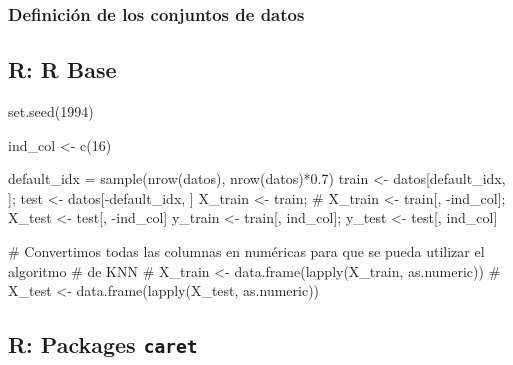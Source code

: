 \documentclass[
  letterpaper,
  DIV=11,
  numbers=noendperiod]{scrartcl}
\newenvironment{Shaded}{\begin{snugshade}}{\end{snugshade}}
\newcommand{\CommentTok}[1]{\textcolor[rgb]{0.37,0.37,0.37}{#1}}
\newcommand{\DecValTok}[1]{\textcolor[rgb]{0.68,0.00,0.00}{#1}}
\newcommand{\FloatTok}[1]{\textcolor[rgb]{0.68,0.00,0.00}{#1}}
\newcommand{\FunctionTok}[1]{\textcolor[rgb]{0.28,0.35,0.67}{#1}}
\newcommand{\NormalTok}[1]{\textcolor[rgb]{0.00,0.23,0.31}{#1}}
\newcommand{\OtherTok}[1]{\textcolor[rgb]{0.00,0.23,0.31}{#1}}
\newcommand{\SpecialCharTok}[1]{\textcolor[rgb]{0.37,0.37,0.37}{#1}}
\begin{document}
\subsubsection{Definición de los conjuntos de
datos}\label{definiciuxf3n-de-los-conjuntos-de-datos}

\subsection{R: R Base}

\begin{Shaded}
\begin{Highlighting}[]
\FunctionTok{set.seed}\NormalTok{(}\DecValTok{1994}\NormalTok{)}

\NormalTok{ind\_col }\OtherTok{\textless{}{-}} \FunctionTok{c}\NormalTok{(}\DecValTok{16}\NormalTok{)}

\NormalTok{default\_idx }\OtherTok{=} \FunctionTok{sample}\NormalTok{(}\FunctionTok{nrow}\NormalTok{(datos), }\FunctionTok{nrow}\NormalTok{(datos)}\SpecialCharTok{*}\FloatTok{0.7}\NormalTok{)}
\NormalTok{train }\OtherTok{\textless{}{-}}\NormalTok{ datos[default\_idx, ]; test }\OtherTok{\textless{}{-}}\NormalTok{ datos[}\SpecialCharTok{{-}}\NormalTok{default\_idx, ]}
\NormalTok{X\_train }\OtherTok{\textless{}{-}}\NormalTok{ train; }
\CommentTok{\# X\_train \textless{}{-} train[, {-}ind\_col];}
\NormalTok{X\_test }\OtherTok{\textless{}{-}}\NormalTok{ test[, }\SpecialCharTok{{-}}\NormalTok{ind\_col]}
\NormalTok{y\_train }\OtherTok{\textless{}{-}}\NormalTok{ train[, ind\_col]; y\_test }\OtherTok{\textless{}{-}}\NormalTok{ test[, ind\_col]}

\CommentTok{\# Convertimos todas las columnas en numéricas para que se pueda utilizar el algoritmo}
\CommentTok{\# de KNN}
\CommentTok{\# X\_train \textless{}{-} data.frame(lapply(X\_train, as.numeric))}
\CommentTok{\# X\_test \textless{}{-} data.frame(lapply(X\_test, as.numeric))}
\end{Highlighting}
\end{Shaded}

\subsection{\texorpdfstring{R: Packages
\texttt{caret}}{R: Packages caret}}
\end{document}
